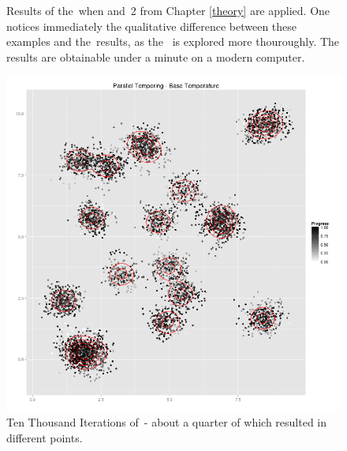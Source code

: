 \begin{figure}
\begin{minipage}[b]{.5\linewidth}
	\end{minipage}
	\caption[\PT\, with \strat\,1 and \strat\,2]{Results of the \PT\,when  and \strat\,2 from Chapter \ref{theory} are applied. One notices immediately the qualitative difference between these examples and the \MH\,results, as the \sspace\, is explored more thouroughly. The results are obtainable under a minute on a modern computer.}\label{PTshort}
\end{figure}

\begin{figure}[ht]
	\centering 
	\includegraphics[width=\textwidth,keepaspectratio]{./img/PT_simululation_base_temperature_10000_steps_1.png}
	\caption[Ten Thousand Iterations of \PT]{Ten Thousand Iterations of \PT\,- about a quarter of which resulted in different points.}\label{PTlong}
\end{figure}